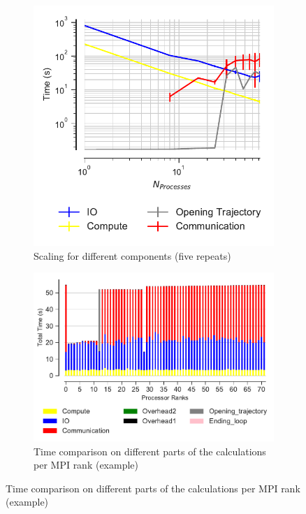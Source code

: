 \begin{figure}
\begin{subfigure}{.4\textwidth}
  \includegraphics[width=\linewidth]{figures/main-RMSD-time_comp_IO_comparison.pdf}
  \captionsetup{format=hang}
\caption{Scaling for different components (five repeats)}
\label{fig:ScalingComputeIO}
\end{subfigure}
\hfill
\begin{subfigure} {.5\textwidth}
  \includegraphics[width=\linewidth]{figures/main-RMSD-BarPlot-rank-comparison_72_5.pdf}
  \captionsetup{format=hang}
  \caption{Time comparison on different parts of the calculations per MPI rank (example)}
  \label{fig:MPIranks}
\end{subfigure}


\end{figure}
